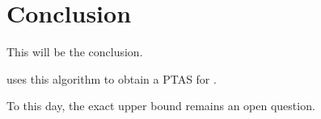 \section{Conclusion}

This will be the conclusion.

\citet{khanna97} uses this algorithm to obtain a PTAS for \RL.

To this day, the exact upper bound remains an open question.